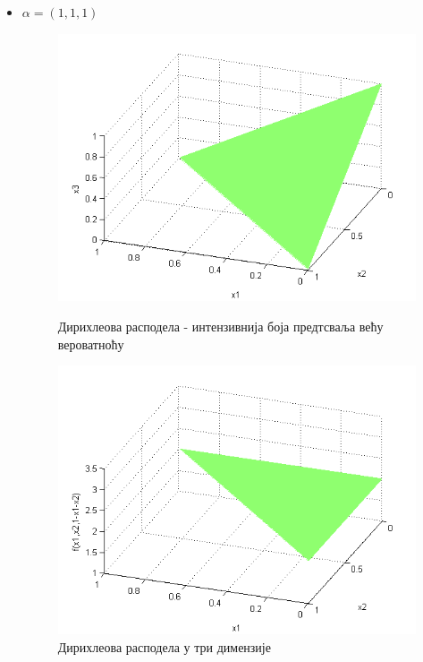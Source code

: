 \begin{itemize}
\begin{figure}[H]
\end{figure}
\item $\alpha = (1,1,1)$
\begin{figure}[H]
  \includegraphics[scale=0.4]{./Slike/slika33.png} 
  \caption{Дирихлеова расподела - интензивнија боја предтсваља већу вероватноћу}\label{fig:slika25}
\endminipage\hfill
{}
  \includegraphics[scale=0.4]{./Slike/slika34.png} 
  \caption{Дирихлеова расподела у три димензије}\label{fig:slika26}
\endminipage\hfill

\end{figure}


\end{itemize}
